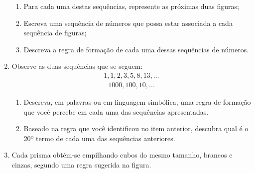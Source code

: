 \begin{enumerate}
\begin{enumerate}
\item {} 
Para cada uma destas sequências, represente as próximas duas figuras;

\item {} 
Escreva uma sequência de números que possa estar associada a cada sequência de figuras;

\item {} 
Descreva a regra de formação de cada uma dessas sequências de números.

\end{enumerate}

 \clearpage
\item Observe as duas sequências que se seguem:
\begin{equation*}
\begin{split}1, 1, 2, 3, 5, 8, 13, \dots\end{split}
\end{equation*}\begin{equation*}
\begin{split}1000, 100, 10, \dots\end{split}
\end{equation*}\begin{enumerate}
\item {} 
Descreva, em palavras ou em linguagem simbólica, uma regra de formação que você percebe em cada uma das sequências apresentadas.

\item {} 
Baseado na regra que você identificou no item anterior, descubra qual é o 20º termo de cada uma das sequências anteriores.

\end{enumerate}

\item Cada prisma obtém-se empilhando cubos do mesmo tamanho, brancos e cinzas, segundo uma regra sugerida na figura.
\label{\detokenize{AF106-E1:fig-prismas}}

\begin{figure}[H]
\centering


\end{figure}
\end{enumerate}
